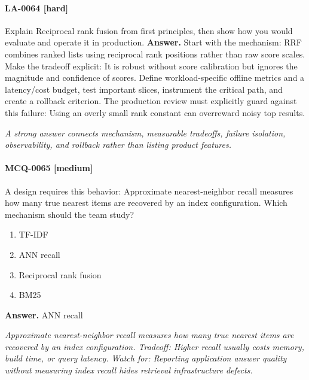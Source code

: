 \paragraph{LA-0064 [hard]} Explain Reciprocal rank fusion from first principles, then show how you would evaluate and operate it in production.
\noindent\textbf{Answer.} Start with the mechanism: RRF combines ranked lists using reciprocal rank positions rather than raw score scales. Make the tradeoff explicit: It is robust without score calibration but ignores the magnitude and confidence of scores. Define workload-specific offline metrics and a latency/cost budget, test important slices, instrument the critical path, and create a rollback criterion. The production review must explicitly guard against this failure: Using an overly small rank constant can overreward noisy top results.
\par\textit{A strong answer connects mechanism, measurable tradeoffs, failure isolation, observability, and rollback rather than listing product features.}
\paragraph{MCQ-0065 [medium]} A design requires this behavior: Approximate nearest-neighbor recall measures how many true nearest items are recovered by an index configuration. Which mechanism should the team study?
\begin{enumerate}[label=\Alph*.]
\item TF-IDF
\item ANN recall
\item Reciprocal rank fusion
\item BM25
\end{enumerate}
\noindent\textbf{Answer.} ANN recall
\par\textit{Approximate nearest-neighbor recall measures how many true nearest items are recovered by an index configuration. Tradeoff: Higher recall usually costs memory, build time, or query latency. Watch for: Reporting application answer quality without measuring index recall hides retrieval infrastructure defects.}
